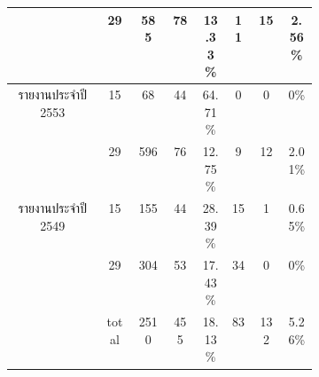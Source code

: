 \begin{table}[H]
\begin{tabular}{|c|c|c|p{0.1\linewidth}|p{0.1\linewidth}|c|p{0.1\linewidth}|p{0.1\linewidth}|}
                                                & 29    & 585       & \multicolumn{1}{c|}{78 }         & \multicolumn{1}{c|}{13.33\%} & \multicolumn{1}{c|}{11}     & \multicolumn{1}{c|}{15 }             & \multicolumn{1}{c|}{2.56\% } \\ \hline
            \multirow{2}{*}{รายงานประจำปี 2553}   & 15    & 68        & \multicolumn{1}{c|}{44 }         & \multicolumn{1}{c|}{64.71\%} & \multicolumn{1}{c|}{0 }     & \multicolumn{1}{c|}{0  }             & \multicolumn{1}{c|}{0\%    } \\ \cline{2-8} 
                                                & 29    & 596       & \multicolumn{1}{c|}{76 }         & \multicolumn{1}{c|}{12.75\%} & \multicolumn{1}{c|}{9 }     & \multicolumn{1}{c|}{12 }             & \multicolumn{1}{c|}{2.01\% } \\ \hline
            \multirow{2}{*}{รายงานประจำปี 2549}   & 15    & 155       & \multicolumn{1}{c|}{44 }         & \multicolumn{1}{c|}{28.39\%} & \multicolumn{1}{c|}{15}     & \multicolumn{1}{c|}{1  }             & \multicolumn{1}{c|}{0.65\% } \\ \cline{2-8} 
                                                & 29    & 304       & \multicolumn{1}{c|}{53 }         & \multicolumn{1}{c|}{17.43\%} & \multicolumn{1}{c|}{34}     & \multicolumn{1}{c|}{0  }             & \multicolumn{1}{c|}{0\%    } \\ \hline
                                                & total & 2510      & \multicolumn{1}{c|}{455}         & \multicolumn{1}{c|}{18.13\%} & \multicolumn{1}{c|}{83}     & \multicolumn{1}{c|}{132}             & \multicolumn{1}{c|}{5.26\% } \\ \hline
            \end{tabular}
            \end{table}

